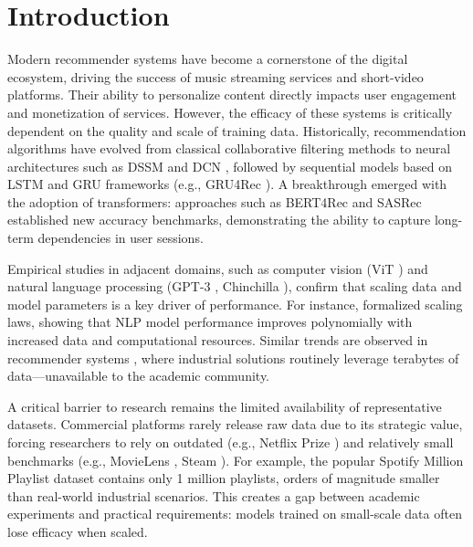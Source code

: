 \documentclass[sigconf,authorversion,nonacm]{acmart}
\begin{document}
\section{Introduction}
Modern recommender systems have become a cornerstone of the digital ecosystem, driving the success of music streaming services and short-video platforms. Their ability to personalize content directly impacts user engagement and monetization of services. However, the efficacy of these systems is critically dependent on the quality and scale of training data. Historically, recommendation algorithms have evolved from classical collaborative filtering methods to neural architectures such as DSSM \cite{huang2013learning} and DCN , followed by sequential models based on LSTM \cite{hochreiter1997long} and GRU \cite{chung2014empirical} frameworks (e.g., GRU4Rec \cite{hidasi2015session}). A breakthrough emerged with the adoption of transformers: approaches such as BERT4Rec \cite{sun2019bert4rec} and SASRec \cite{kang2018self} established new accuracy benchmarks, demonstrating the ability to capture long-term dependencies in user sessions.

Empirical studies in adjacent domains, such as computer vision (ViT \cite{dosovitskiy2020image}) and natural language processing (GPT-3 \cite{brown2020language}, Chinchilla \cite{hoffmann2022training}), confirm that scaling data and model parameters is a key driver of performance. For instance, \cite{kaplan2020scaling} formalized scaling laws, showing that NLP model performance improves polynomially with increased data and computational resources. Similar trends are observed in recommender systems , where industrial solutions routinely leverage terabytes of data—unavailable to the academic community.

A critical barrier to research remains the limited availability of representative datasets. Commercial platforms rarely release raw data due to its strategic value, forcing researchers to rely on outdated (e.g., Netflix Prize \cite{bennett2007netflix}) and relatively small benchmarks (e.g., MovieLens \cite{harper2015movielens}, Steam \cite{kang2018self}). For example, the popular Spotify Million Playlist \cite{chen2018recsys} dataset contains only 1 million playlists, orders of magnitude smaller than real-world industrial scenarios. This creates a gap between academic experiments and practical requirements: models trained on small-scale data often lose efficacy when scaled.
\end{document}
